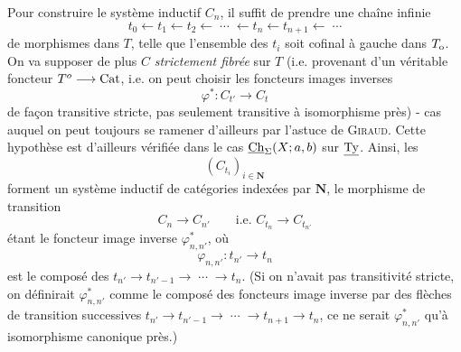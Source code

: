 Pour construire le système inductif $C_{n}$, il suffit de prendre une chaîne infinie
\[
t_{0} \longleftarrow t_{1} \longleftarrow t_{2} \longleftarrow \;\cdots\; \longleftarrow t_{n} \longleftarrow t_{n+1} \longleftarrow \;\cdots
\]
de morphismes dans $T$, telle que l'ensemble des $t_{i}$ soit cofinal à gauche dans $T_{\mathrm{o}}$. On va supposer de plus $C$ \textit{strictement fibrée} sur $T$ (i.e. provenant d'un véritable foncteur $T^{o} \longrightarrow \mathrm{Cat}$, i.e. on peut choisir les foncteurs images inverses
\[
\varphi^{*} : C_{t'} \longrightarrow C_{t}
\]
de façon transitive stricte, pas seulement transitive à isomorphisme près) - cas auquel on peut toujours se ramener d'ailleurs par l'astuce de \textsc{Giraud}. Cette hypothèse est d'ailleurs vérifiée dans le cas $\underline{\mathrm{Ch}}_{\Sigma}(X;a,b)$ sur $\underline{\mathrm{Ty}}$. Ainsi, les
\[
(C_{t_{i}})_{i\in\mathbf{N}}
\]
forment un système inductif de catégories indexées par $\mathbf{N}$, le morphisme de transition
\[
C_{n} \longrightarrow C_{n'} \qquad \text{i.e. } C_{t_{n}} \longrightarrow C_{t_{n'}}
\]
étant le foncteur image inverse $\varphi^{*}_{n,n'}$, où
\[
\varphi_{n,n'} : t_{n'} \longrightarrow t_{n}
\]
est le composé des $t_{n'} \longrightarrow t_{n'-1} \longrightarrow \;\cdots\; \longrightarrow t_{n}$. (Si on n'avait pas transitivité stricte, on définirait $\varphi^{*}_{n,n'}$ comme le composé des foncteurs image inverse par des flèches de transition successives $t_{n'} \longrightarrow t_{n'-1} \longrightarrow \;\cdots\; \longrightarrow t_{n+1} \longrightarrow t_{n}$, ce ne serait $\varphi^{*}_{n,n'}$ qu'à isomorphisme canonique près.)

